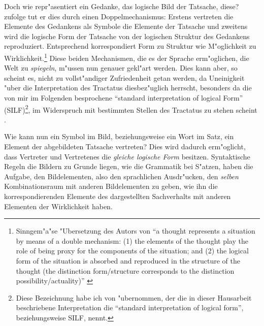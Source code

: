 \documentclass[a4paper, emulatestandardclasses, 12pt]{scrartcl}
\begin{document}
\begin{onehalfspace}
Doch wie repr"asentiert ein Gedanke, das logische Bild der Tatsache, diese? \citet{frascolla2007understanding} zufolge tut er dies durch einen Doppelmechanismus: Erstens vertreten die Elemente des Gedankens als Symbole die Elemente der Tatsache und zweitens wird die logische Form der Tatsache von der logischen Struktur des Gedankens reproduziert. Entsprechend korrespondiert Form zu Struktur wie M"oglichkeit zu Wirklichkeit.\footnote{Sinngem"a"se "Ubersetzung des Autors von "`a thought represents a situation by means of a double mechanism: (1) the elements of the thought play the role of being proxy for the components of the situation; and (2) the logical form of the situation is absorbed and reproduced in the structure of the thought (the distinction form/structure corresponds to the distinction possibility/actuality)"' \cite[S.46]{frascolla2007understanding}} Diese beiden Mechanismen, die es der Sprache erm"oglichen, die Welt zu \emph{spiegeln}, m"ussen nun genauer gekl"art werden. Dies kann aber, so scheint es, nicht zu vollst"andiger Zufriedenheit getan werden, da Uneinigkeit "uber die Interpretation des Tractatus diesbez"uglich herrscht, besonders da die von mir im Folgenden besprochene "`standard interpretation of logical Form"' (SILF)\footnote{Diese Bezeichnung habe ich von \citet{emiliani1999formsp} "ubernommen, der die in dieser Hausarbeit beschriebene Interpretation die "`standard interpretation of logical form"', beziehungsweise SILF, nennt.}, im Widerspruch mit bestimmten Stellen des Tractatus zu stehen scheint \cite[vgl.][S. 95 ff.]{emiliani1999formsp}. 




Wie kann nun ein Symbol im Bild, beziehungsweise ein Wort im Satz, ein Element der abgebildeten Tatsache vertreten? Dies wird dadurch erm"oglicht, dass Vertreter und Vertretenes die \emph{gleiche logische Form} besitzen. Syntaktische Regeln die Bildern zu Grunde liegen, wie die Grammatik bei S"atzen, haben die Aufgabe, den Bildelementen, also den sprachlichen Ausdr"ucken, den \emph{selben} Kombinationsraum mit anderen Bildelementen zu geben, wie ihn die korrespondierenden Elemente des dargestellten Sachverhalts mit anderen Elementen der Wirklichkeit haben. 


\end{onehalfspace}
\end{document}
